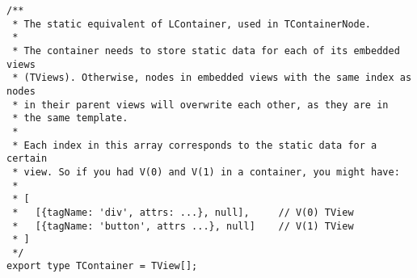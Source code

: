 \begin{verbatim}
/**
 * The static equivalent of LContainer, used in TContainerNode.
 *
 * The container needs to store static data for each of its embedded views
 * (TViews). Otherwise, nodes in embedded views with the same index as nodes
 * in their parent views will overwrite each other, as they are in
 * the same template.
 *
 * Each index in this array corresponds to the static data for a certain
 * view. So if you had V(0) and V(1) in a container, you might have:
 *
 * [
 *   [{tagName: 'div', attrs: ...}, null],     // V(0) TView
 *   [{tagName: 'button', attrs ...}, null]    // V(1) TView
 * ]
 */
export type TContainer = TView[];
\end{verbatim}
